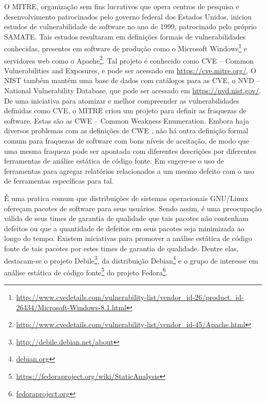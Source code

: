   O MITRE, organização sem fins lucrativos que opera centros de pesquisa e desenvolvimento patrocinados pelo governo federal dos Estados Unidos, iniciou estudos de vulnerabilidade de software no ano de 1999, patrocinado pelo próprio SAMATE. Tais estudos resultaram em definições formais de vulnerabilidades conhecidas, presentes em software de produção como o Microsoft Windows\footnote{\url{http://www.cvedetails.com/vulnerability-list/vendor_id-26/product_id-26434/Microsoft-Windows-8.1.html}} e servidores web como o Apache\footnote{\url{http://www.cvedetails.com/vulnerability-list/vendor_id-45/Apache.html}}. Tal projeto é conhecido como CVE – Common Vulnerabilities and Exposures, e pode ser acessado em \url{https://cve.mitre.org/}. O NIST também mantém uma base de dados com catálogos para as CVE, o NVD – National Vulnerability Database, que pode ser acessado em \url{https://nvd.nist.gov/}. De uma iniciativa para atomizar e melhor compreender as vulnerabilidades definidas como CVE, o MITRE criou um projeto para definir as fraquezas de software. Estas são as CWE – Common Weakness Enumeration. Embora haja diversos problemas com as definições de CWE \cite{yan}, não há outra definição formal comum para fraquezas de software com bons níveis de aceitação, de modo que uma mesma fraqueza pode ser apontada com diferentes descrições por diferentes ferramentas de análise estática de código fonte. Em \cite{clustering} sugere-se o uso de ferramentas para agregar relatórios relacionados a um mesmo defeito com o uso de ferramentas específicas para tal.

  É uma pratica comum que distribuições de sistemas operacionais GNU/Linux ofereçam pacotes de software para seus usuários. Sendo assim, é uma preocupação válida de seus times de garantia de qualidade que tais pacotes não contenham defeitos ou que a quantidade de defeitos em seus pacotes seja minimizada ao longo do tempo. Existem iniciativas para promover a análise estática de código fonte de tais pacotes por estes times de garantia de qualidade. Dentre elas, destacam-se o projeto Debile\footnote{\url{http://debile.debian.net/about}}, da distribuição Debian\footnote{\url{debian.org}} e o grupo de interesse em análise estática de código fonte\footnote{\url{https://fedoraproject.org/wiki/StaticAnalysis}} do projeto Fedora\footnote{\url{fedoraproject.org}}.

